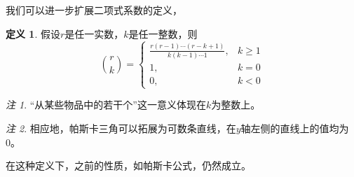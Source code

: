 \documentclass[a4paper,11pt]{article}%
\theoremstyle{remark}
\newtheorem*{remark}{注}
\theoremstyle{remark}
\theoremstyle{definition}
\theoremstyle{definition}
\newtheorem*{definition}{定义}
\theoremstyle{definition}
\begin{document}
我们可以进一步扩展二项式系数的定义，
\begin{definition}
    假设$r$是任一实数，$k$是任一整数，则
\[ 
\binom{r}{k}=
\begin{cases}
    \frac{r(r-1)\cdots(r-k+1)}{k(k-1)\cdots 1},&k\geq 1\\
    1,&k=0\\
    0,&k<0
\end{cases}    
\]
\end{definition}
\begin{remark}
    “从某些物品中的若干个”这一意义体现在$k$为整数上。
\end{remark}
\begin{remark}
    相应地，帕斯卡三角可以拓展为可数条直线，在$y$轴左侧的直线上的值均为0。
\end{remark}
在这种定义下，之前的性质，如帕斯卡公式，仍然成立。
\end{document}
